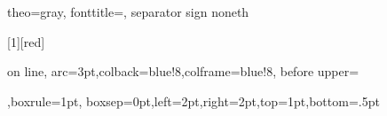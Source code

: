 {theo=gray, fonttitle=\scriptsize, separator sign none}{th}


\usepackage{chngcntr}

\newcommand\TITULOS{\fontfamily{qag}\selectfont}


\usepackage{inconsolata}
\newtcbox{\TECLAS}[1][red]{on line,
arc=3pt,colback=blue!8,colframe=blue!8,
before upper={\rule[-3pt]{0pt}{10pt}},boxrule=1pt,
boxsep=0pt,left=2pt,right=2pt,top=1pt,bottom=.5pt}

\makeatletter
%
\usepackage{pict2e,picture}
\newsavebox\csteps@CBox
\newlength\csteps@XLength \newlength\csteps@YLength \newlength\csteps@YDepth \newlength\csteps@tmplen
\def\csteps@CircledParam#1#2{\sbox\csteps@CBox{#2}%
    \csteps@XLength=\wd\csteps@CBox\advance\csteps@XLength by\pgfkeysvalueof{/csteps/inner xsep}\relax
    \csteps@tmplen=\pgfkeysvalueof{/csteps/inner ysep}\relax
    \csteps@YDepth=\dp\csteps@CBox\advance\csteps@YDepth by 0.5\csteps@tmplen\relax
    \csteps@YLength=\ht\csteps@CBox\advance\csteps@YLength by\dp\csteps@CBox\advance\csteps@YLength by\pgfkeysvalueof{/csteps/inner ysep}\relax
    \typeout{DBG:#2\space X\space\the\csteps@XLength\space Y:\the\csteps@YLength\space D:\the\csteps@YDepth}%
    \raisebox{-#1\csteps@YDepth}{%
    \ifdim\csteps@XLength>\csteps@YLength
    \makebox[\csteps@XLength]{%
        \makebox(0,\csteps@YLength){%
            \color{\pgfkeysvalueof{/csteps/outer color}}\put(0,0){\oval(\csteps@XLength,\csteps@YLength)}%
        }%
    \makebox(0,\csteps@YLength){%
        \put(-.5\wd\csteps@CBox,0){\textcolor{\pgfkeysvalueof{/csteps/inner color}}{#2}}%
    }}%
    \else
    \makebox[\csteps@YLength]{%
        \makebox(0,\csteps@YLength){%
            \color{\pgfkeysvalueof{/csteps/outer color}}\put(0,0){\circle{\csteps@YLength}}%
        }%
    \makebox(0,\csteps@YLength){%
        \put(-.5\wd\csteps@CBox,0){\textcolor{\pgfkeysvalueof{/csteps/inner color}}{#2}}%
     }}%
    \fi
    }%
}
\def\Circled#1{\csteps@CircledParam{1}{#1}}
\def\CircledTop#1{\csteps@CircledParam{0}{#1}}
\makeatother

